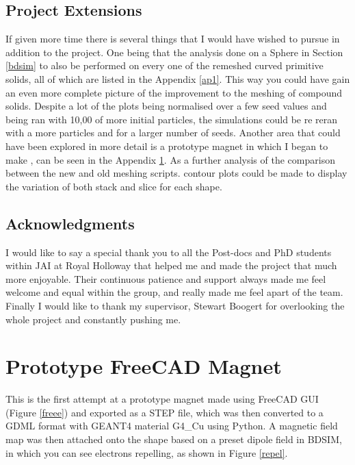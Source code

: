 \documentclass[12pt,a4paper]{article}
\begin{document}
\subsection{Project Extensions}
If given more time there is several things that I  would have wished to pursue in addition to the project. One being that the analysis done on a Sphere in Section \ref{bdsim} to also be performed on every one of the remeshed curved primitive solids, all of which are listed in the Appendix \ref{ap1}. This way you could have gain an even more complete picture of the improvement to the meshing of compound solids. Despite a lot of the plots being normalised over a few seed values and being ran with 10,00 of more initial particles, the simulations could be re reran with a more particles and for a larger number of seeds. Another area that could have been explored in more detail is a prototype magnet in which I began to make , can be seen in the Appendix \ref{mag}. As a further analysis of the comparison between the new and old meshing scripts. contour plots could be made to display the variation of both stack and slice for each shape.

\subsection{Acknowledgments}
I would like to say a special thank you to all the Post-docs and PhD students within JAI at Royal Holloway that helped me and made the project that much more enjoyable. Their continuous patience and support always made me feel welcome and equal within the group, and really made me feel apart of the team. Finally I would like to thank my supervisor, Stewart Boogert for overlooking the whole project and constantly pushing me. 

\newpage
\newpage
\footnotesize



\normalsize
\appendix
\setcounter{figure}{0} 

\section{Prototype FreeCAD Magnet}
\label{mag}
This is the first attempt at a prototype magnet made using FreeCAD GUI (Figure \ref{freee}) and exported as a STEP file, which was then converted to a GDML format with GEANT4 material G4\_Cu using Python. A magnetic field map was then attached onto the shape based on a preset dipole field in BDSIM, in which you can see electrons repelling, as shown in Figure \ref{repel}.
\end{document}
